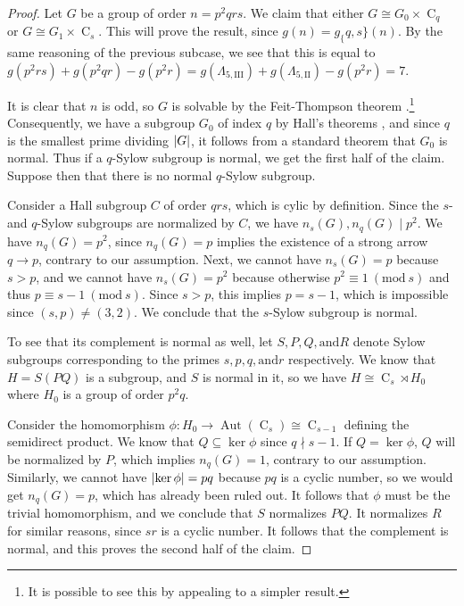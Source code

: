 \documentclass[a4paper, 12pt]{article}
\DeclarePairedDelimiter\abs{\lvert}{\rvert}
\newcommand{\aut}[1]{\operatorname{Aut}(#1)}
\newcommand{\cyc}[1]{\operatorname{C}_{#1}}
\newcommand{\Mod}[1]{\ (\mathrm{mod} \ #1)}
\newcommand{\qlamz}{\Lambda_{5,\text{II}}}
\newcommand{\qlamd}{\Lambda_{5,\text{III}}}
\theoremstyle{plain}
\theoremstyle{definition}
\begin{document}
\begin{proof}
Let $G$ be a group of order $n = p^2 q r s$. We claim that either $G \cong G_0 \times \cyc{q}$ or $G \cong G_1\times \cyc{s}$. This will prove the result, since $g(n) = g_\{q, s\}(n).$ By the same reasoning of the previous subcase, we see that this is equal to $g(p^2 r s) + g(p^2 q r) - g(p^2 r) = g(\qlamd) + g(\qlamz) - g(p^2 r) = 7$.

It is clear that $n$ is odd, so $G$ is solvable by the Feit-Thompson theorem {\cite{oddsolve}}.\footnote{It is possible to see this by appealing to a simpler result.} Consequently, we have a subgroup $G_0$ of index $q$ by Hall's theorems {\cite[Thm.~3.13]{fgt}}, and since $q$ is the smallest prime dividing $\abs{G}$, it follows from a standard theorem {\cite[Prob.~1A.1]{fgt}} that $G_0$ is normal. Thus if a $q$-Sylow subgroup is normal, we get the first half of the claim. Suppose then that there is no normal $q$-Sylow subgroup.

Consider a Hall subgroup $C$ of order $qrs$, which is cylic by definition. Since the $s$- and $q$-Sylow subgroups are normalized by $C$, we have $n_s(G), n_q(G) \mid p^2$. We have $n_q(G) = p^2$, since $n_q(G) = p$ implies the existence of a strong arrow \nopagebreak[4] $q \rightarrow p$, contrary to our assumption. Next, we cannot have $n_s(G) = p$ because $s > p$, and we cannot have $n_s(G) = p^2$ because otherwise $p^2 \equiv 1 \Mod{s}$ and thus $p \equiv s - 1 \Mod{s}$. Since $s > p$, this implies $p = s - 1$, which is impossible since $(s, p) \neq (3, 2)$. We conclude that the $s$-Sylow subgroup is normal. 

To see that its complement is normal as well, let $S, P, Q, \text{and} R$ denote Sylow subgroups corresponding to the primes $s, p, q, \text{and} r$ respectively. We know that $H = S(PQ)$ is a subgroup, and $S$ is normal in it, so we have $H \cong \cyc{s} \rtimes H_0$ where $H_0$ is a group of order $p^2 q$.

Consider the homomorphism $\phi : H_0 \rightarrow \aut{\cyc{s}} \cong \cyc{s - 1}$ defining the semidirect product. We know that $Q \subseteq \ker \phi$ since $q \nmid s - 1$. If $Q = \ker \phi$, $Q$ will be normalized by $P$, which implies $n_q(G) = 1$, contrary to our assumption. Similarly, we cannot have $\abs{\ker \phi} = pq$ because $pq$ is a cyclic number, so we would get $n_q(G) = p$, which has already been ruled out. It follows that $\phi$ must be the trivial homomorphism, and we conclude that $S$ normalizes $PQ$. It normalizes $R$ for similar reasons, since $sr$ is a cyclic number.  It follows that the complement is normal, and this proves the second half of the claim.



\end{proof}
\end{document}

